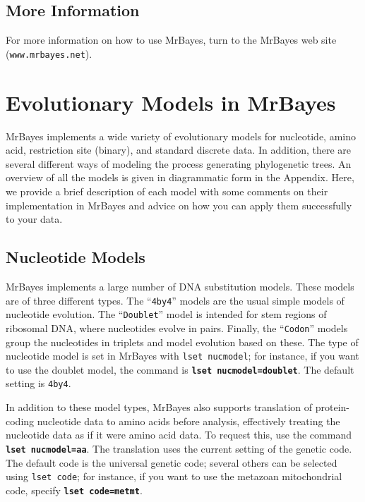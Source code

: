 \documentclass[12pt]{book}
\newcommand{\ttt}[1]{\texttt{#1}}
\newcommand{\tb}[1]{\ttt{\textbf{#1}}}
\begin{document}
\section{More Information}

For more information on how to use MrBayes, turn to the MrBayes web site
(\ttt{www.mrbayes.net}).


\chapter{Evolutionary Models in MrBayes}
\label{evolutionaryModels}

MrBayes implements a wide variety of evolutionary models for nucleotide, amino acid, restriction
site (binary), and standard discrete data. In addition, there are several different ways of
modeling the process generating phylogenetic trees. An overview of all the models is given in
diagrammatic form in the Appendix. Here, we provide a brief description of each model with some
comments on their implementation in MrBayes and advice on how you can apply them successfully to
your data.

\section{Nucleotide Models}

MrBayes implements a large number of DNA substitution models. These models are of three different
types. The ``\ttt{4by4}'' models are the usual simple models of nucleotide evolution. The
``\ttt{Doublet}'' model is intended for stem regions of ribosomal DNA, where nucleotides evolve in
pairs. Finally, the ``\ttt{Codon}'' models group the nucleotides in triplets and model evolution
based on these. The type of nucleotide model is set in MrBayes with \ttt{lset nucmodel}; for
instance, if you want to use the doublet model, the command is \tb{lset nucmodel=doublet}. The
default setting is \ttt{4by4}.

In addition to these model types, MrBayes also supports translation of protein-coding nucleotide
data to amino acids before analysis, effectively treating the nucleotide data as if it were amino
acid data. To request this, use the command \tb{lset nucmodel=aa}. The translation uses the current
setting of the genetic code. The default code is the universal genetic code; several others can be
selected using \ttt{lset code}; for instance, if you want to use the metazoan mitochondrial code,
specify \tb{lset code=metmt}.
\end{document}
